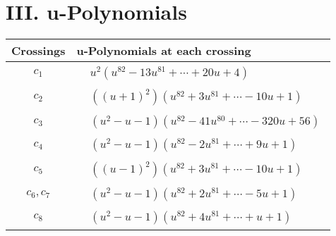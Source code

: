 \documentclass[1p]{elsarticle_modified}
\theoremstyle{definition}
\begin{document}
\centering \section*{ III. u-Polynomials}
\begin{tabular}{m{50pt}|m{274pt}}
Crossings & \hspace{64pt}u-Polynomials at each crossing \\
\hline $$\begin{aligned}c_{1}\end{aligned}$$&$\begin{aligned}
&u^2(u^{82}-13 u^{81}+\cdots+20 u+4)
\end{aligned}$\\
\hline $$\begin{aligned}c_{2}\end{aligned}$$&$\begin{aligned}
&((u+1)^2)(u^{82}+3 u^{81}+\cdots-10 u+1)
\end{aligned}$\\
\hline $$\begin{aligned}c_{3}\end{aligned}$$&$\begin{aligned}
&(u^2- u-1)(u^{82}-41 u^{80}+\cdots-320 u+56)
\end{aligned}$\\
\hline $$\begin{aligned}c_{4}\end{aligned}$$&$\begin{aligned}
&(u^2- u-1)(u^{82}-2 u^{81}+\cdots+9 u+1)
\end{aligned}$\\
\hline $$\begin{aligned}c_{5}\end{aligned}$$&$\begin{aligned}
&((u-1)^2)(u^{82}+3 u^{81}+\cdots-10 u+1)
\end{aligned}$\\
\hline $$\begin{aligned}c_{6},c_{7}\end{aligned}$$&$\begin{aligned}
&(u^2- u-1)(u^{82}+2 u^{81}+\cdots-5 u+1)
\end{aligned}$\\
\hline $$\begin{aligned}c_{8}\end{aligned}$$&$\begin{aligned}
&(u^2- u-1)(u^{82}+4 u^{81}+\cdots+u+1)
\end{aligned}$\\

\end{tabular}
\end{document}

